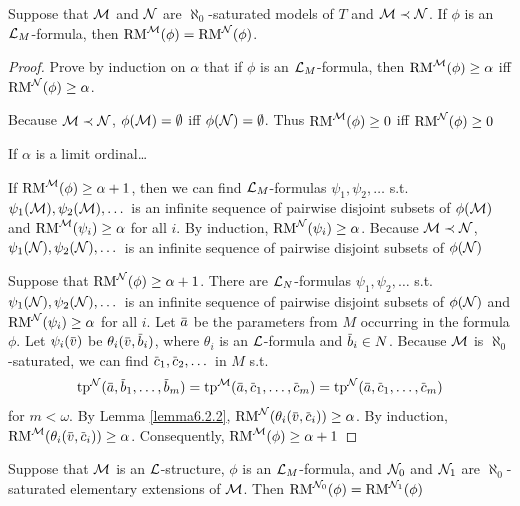 \documentclass[11pt]{article}
\begin{document}
\begin{lemma}[]
\label{lemma6.2.3}
Suppose that \(\mathcal{M}\) and \(\mathcal{N}\) are \(\aleph_0\)-saturated models of \(T\) and \(\mathcal{M}\prec\mathcal{N}\). If \(\phi\) is
an \(\mathcal{L}_M\)-formula, then \(\operatorname{RM}^{\mathcal{M}}(\phi)=\operatorname{RM}^{\mathcal{N}}(\phi)\).
\end{lemma}

\begin{proof}
Prove by induction on \(\alpha\) that if \(\phi\) is an \(\mathcal{L}_M\)-formula, then \(\operatorname{RM}^{\mathcal{M}}(\phi)\ge\alpha\)
iff \(\operatorname{RM}^{\mathcal{N}}(\phi)\ge\alpha\).

Because \(\mathcal{M}\prec\mathcal{N}\), \(\phi(\mathcal{M})=\emptyset\) iff \(\phi(\mathcal{N})=\emptyset\). Thus \(\operatorname{RM}^{\mathcal{M}}(\phi)\ge 0\) iff \(\operatorname{RM}^{\mathcal{N}}(\phi)\ge 0\)

If \(\alpha\) is a limit ordinal\ldots{}

If \(\operatorname{RM}^{\mathcal{M}}(\phi)\ge\alpha+1\), then we can find \(\mathcal{L}_M\)-formulas \(\psi_1,\psi_2,\dots\) s.t. \(\psi_1(\mathcal{M}),\psi_2(\mathcal{M}),\dots\) is
an infinite sequence of pairwise disjoint subsets of \(\phi(\mathcal{M})\) and \(\operatorname{RM}^{\mathcal{M}}(\psi_i)\ge\alpha\) for
all \(i\). By induction, \(\operatorname{RM}^{\mathcal{N}}(\psi_i)\ge\alpha\). Because \(\mathcal{M}\prec\mathcal{N}\), \(\psi_1(\mathcal{N}),\psi_2(\mathcal{N}),\dots\) is an infinite
sequence of pairwise disjoint subsets of \(\phi(\mathcal{N})\)

Suppose that \(\operatorname{RM}^{\mathcal{N}}(\phi)\ge\alpha+1\). There are  \(\mathcal{L}_N\)-formulas \(\psi_1,\psi_2,\dots\) s.t. \(\psi_1(\mathcal{N}),\psi_2(\mathcal{N}),\dots\) is
an infinite sequence of pairwise disjoint subsets of \(\phi(\mathcal{N})\) and \(\operatorname{RM}^{\mathcal{N}}(\psi_i)\ge\alpha\) for
all \(i\). Let \(\bara\) be the parameters from \(M\) occurring in the formula \(\phi\).
Let \(\psi_i(\barv)\) be \(\theta_i(\barv,\barb_i)\), where \(\theta_i\) is an \(\mathcal{L}\)-formula and \(\barb_i\in N\).
Because \(\mathcal{M}\) is \(\aleph_0\)-saturated, we can find \(\barc_1,\barc_2,\dots\) in \(M\) s.t.
\begin{equation*}
\tp^{\caln}(\bara,\barb_1,\dots,\barb_m)=\tp^{\calm}(\bara,\barc_1,\dots,\barc_m)=\tp^{\caln}(\bara,\barc_1,\dots,\barc_m)
\end{equation*}
for \(m<\omega\). By Lemma \ref{lemma6.2.2}, \(\RM^{\caln}(\theta_i(\barv,\barc_i))\ge\alpha\). By
induction, \(\RM^{\calm}(\theta_i(\barv,\barc_i))\ge\alpha\). Consequently, \(\operatorname{RM}^{\mathcal{M}}(\phi)\ge\alpha+1\)
\end{proof}

\begin{corollary}[]
\label{cor6.2.4}
Suppose that \(\mathcal{M}\) is an \(\mathcal{L}\)-structure, \(\phi\) is an \(\mathcal{L}_M\)-formula, and \(\mathcal{N}_0\) and \(\mathcal{N}_1\)
are \(\aleph_0\)-saturated elementary extensions of \(\mathcal{M}\). Then \(\operatorname{RM}^{\mathcal{N}_0}(\phi)=\operatorname{RM}^{\mathcal{N}_1}(\phi)\)
\end{corollary}
\end{document}
